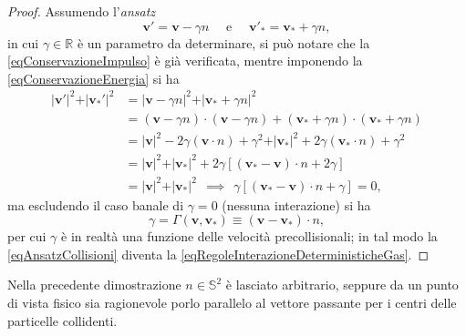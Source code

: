         \begin{proof}
          Assumendo l'\textit{ansatz}
          \begin{equation}
            \label{eqAnsatzCollisioni}
            \mathbf v'=\mathbf v-\gamma n\quad\text{ e }\quad\mathbf v'_*=\mathbf v_*+\gamma n,
          \end{equation}
          in cui \(\gamma\in\mathbb R\) è un parametro da determinare, si può notare che la \eqref{eqConservazioneImpulso} è già verificata, mentre imponendo la \eqref{eqConservazioneEnergia} si ha
          \[
            \begin{aligned}
              \vert\mathbf v'\vert^2+\vert\mathbf v_*'\vert^2
              &=\vert\mathbf v-\gamma n\vert^2+\vert\mathbf v_*+\gamma n\vert^2\\
              &=(\mathbf v-\gamma n)\cdot(\mathbf v-\gamma n)
              +(\mathbf v_*+\gamma n)\cdot(\mathbf v_*+\gamma n)\\
              &=\vert\mathbf v\vert^2-2\gamma(\mathbf v\cdot n)
              +\gamma^2+\vert\mathbf v_*\vert^2
              +2\gamma(\mathbf v_*\cdot n)+\gamma^2\\
              &=\vert\mathbf v\vert^2+\vert\mathbf v_*\vert^2
              +2\gamma[(\mathbf v_*-\mathbf v)\cdot n+2\gamma]\\
              &=\vert\mathbf v\vert^2+\vert\mathbf v_*\vert^2
              \ \ \implies\ \ 
              \gamma[(\mathbf v_*-\mathbf v)\cdot n+\gamma]=0,
            \end{aligned}
          \]
          ma escludendo il caso banale di \(\gamma=0\) (nessuna interazione) si ha
          \[
            \gamma=\Gamma(\mathbf v,\mathbf v_*)\equiv(\mathbf v-\mathbf v_*)\cdot n,
          \]
          per cui \(\gamma\) è in realtà una funzione delle velocità precollisionali; in tal modo la \cref{eqAnsatzCollisioni} diventa la \cref{eqRegoleInterazioneDeterministicheGas}.
        \end{proof}
        \begin{oss}
          Nella precedente dimostrazione \(n\in\mathbb S^2\) è lasciato arbitrario, seppure da un punto di vista fisico sia ragionevole porlo parallelo al vettore passante per i centri delle particelle collidenti.
        \end{oss}

